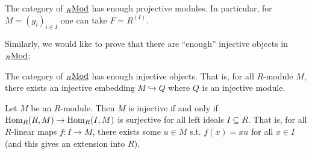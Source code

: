 \documentclass{article}
\begin{document}
\begin{corollary}
    The category of ${}_{R}\underline{\textup{Mod}}$ has enough projective modules. In particular, for $M = (g_i)_{i\in I}$ one can take $F = R^{(I)}$. 
\end{corollary}

Similarly, we would like to prove that there are ``enough'' injective objects in ${}_{R}\underline{\textup{Mod}}$:

\begin{theorem}\label{thm:enough injectives}
    The category of ${}_{R}\underline{\textup{Mod}}$ has enough injective objects. That is, for all $R$-module $M$, there exists an injective embedding $M \hookrightarrow Q$ where $Q$ is an injective module.
\end{theorem}

\begin{proposition}[Baer]\label{prop:Baer}
    Let $M$ be an $R$-module. Then $M$ is injective if and only if $\mathrm{Hom}_R(R, M) \to \mathrm{Hom}_R(I, M)$ is surjective for all left ideals $I \subseteq R$. That is, for all $R$-linear maps $f: I \to M$, there exists some $u\in M$ s.t. $f(x) = xu$ for all $x\in I$ (and this gives an extension into $R$).
\end{proposition}
\end{document}
